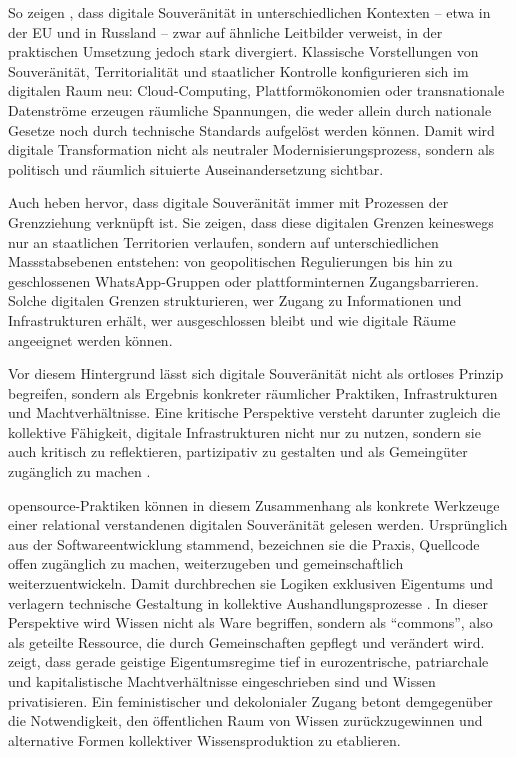 So zeigen \textcite{glaszeContestedSpatialitiesDigital2023}, dass digitale Souveränität in unterschiedlichen Kontexten -- etwa in der EU und in Russland -- zwar auf ähnliche Leitbilder verweist, in der praktischen Umsetzung jedoch stark divergiert. Klassische Vorstellungen von Souveränität, Territorialität und staatlicher Kontrolle konfigurieren sich im digitalen Raum neu: Cloud-Computing, Plattformökonomien oder transnationale Datenströme erzeugen räumliche Spannungen, die weder allein durch nationale Gesetze noch durch technische Standards aufgelöst werden können. Damit wird digitale Transformation nicht als neutraler Modernisierungsprozess, sondern als politisch und räumlich situierte Auseinandersetzung sichtbar.

Auch \textcite{zhangBordersBorderingSovereignty2023} heben hervor, dass digitale Souveränität immer mit Prozessen der Grenzziehung verknüpft ist. Sie zeigen, dass diese digitalen Grenzen keineswegs nur an staatlichen Territorien verlaufen, sondern auf unterschiedlichen Massstabsebenen entstehen: von geopolitischen Regulierungen bis hin zu geschlossenen WhatsApp-Gruppen oder plattforminternen Zugangsbarrieren. Solche digitalen Grenzen strukturieren, wer Zugang zu Informationen und Infrastrukturen erhält, wer ausgeschlossen bleibt und wie digitale Räume angeeignet werden können.

Vor diesem Hintergrund lässt sich digitale Souveränität nicht als ortloses Prinzip begreifen, sondern als Ergebnis konkreter räumlicher Praktiken, Infrastrukturen und Machtverhältnisse. Eine kritische Perspektive versteht darunter zugleich die kollektive Fähigkeit, digitale Infrastrukturen nicht nur zu nutzen, sondern sie auch kritisch zu reflektieren, partizipativ zu gestalten und als Gemeingüter zugänglich zu machen \parencite{baackDataficationEmpowermentHow2015}. 

\vspace{1em}

\gls{opensource}-Praktiken können in diesem Zusammenhang als konkrete Werkzeuge einer relational verstandenen digitalen Souveränität gelesen werden. Ursprünglich aus der Softwareentwicklung stammend, bezeichnen sie die Praxis, Quellcode offen zugänglich zu machen, weiterzugeben und gemeinschaftlich weiterzuentwickeln. Damit durchbrechen sie Logiken exklusiven Eigentums und verlagern technische Gestaltung in kollektive Aushandlungsprozesse \parencite{mathewFeministManifestoResistance2021}. In dieser Perspektive wird Wissen nicht als Ware begriffen, sondern als \enquote{commons}, also als geteilte Ressource, die durch Gemeinschaften gepflegt und verändert wird. \textcite{mathewFeministManifestoResistance2021} zeigt, dass gerade geistige Eigentumsregime tief in eurozentrische, patriarchale und kapitalistische Machtverhältnisse eingeschrieben sind und Wissen privatisieren. Ein feministischer und dekolonialer Zugang betont demgegenüber die Notwendigkeit, den öffentlichen Raum von Wissen zurückzugewinnen und alternative Formen kollektiver Wissensproduktion zu etablieren.

